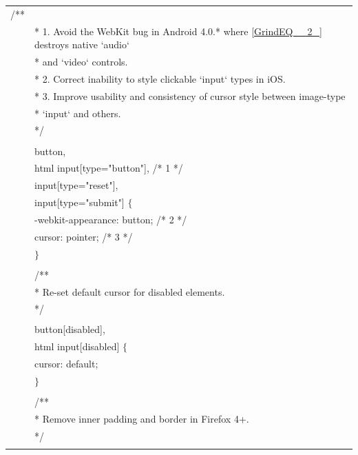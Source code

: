 \documentclass{article} %
\begin{document}
\begin{tabular}{|p{0.4in}|p{3.7in}|} \hline 
 \\ \hline 
/** \\ \hline 
 &  * 1. Avoid the WebKit bug in Android 4.0.* where \eqref{GrindEQ__2_} destroys native `audio` \\ \hline 
 &  *    and `video` controls. \\ \hline 
 &  * 2. Correct inability to style clickable `input` types in iOS. \\ \hline 
 &  * 3. Improve usability and consistency of cursor style between image-type \\ \hline 
 &  *    `input` and others. \\ \hline 
 &  */ \\ \hline 
 & \newline  \\ \hline 
 & button, \\ \hline 
 & html input[type="button"], /* 1 */ \\ \hline 
 & input[type="reset"], \\ \hline 
 & input[type="submit"] $\mathrm{\{}$ \\ \hline 
 &   -webkit-appearance: button; /* 2 */ \\ \hline 
 &   cursor: pointer; /* 3 */ \\ \hline 
 & $\mathrm{\}}$ \\ \hline 
 & \newline  \\ \hline 
 & /** \\ \hline 
 &  * Re-set default cursor for disabled elements. \\ \hline 
 &  */ \\ \hline 
 & \newline  \\ \hline 
 & button[disabled], \\ \hline 
 & html input[disabled] $\mathrm{\{}$ \\ \hline 
 &   cursor: default; \\ \hline 
 & $\mathrm{\}}$ \\ \hline 
 & \newline  \\ \hline 
 & /** \\ \hline 
 &  * Remove inner padding and border in Firefox 4+. \\ \hline 
 &  */ \\ \hline 
 & \newline  \\ \hline 

\end{tabular}
\end{document}
